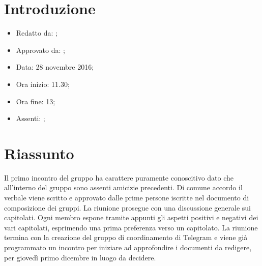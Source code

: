 \section{Introduzione}

	\begin{itemize}
		\item Redatto da: \NS;
		\item Approvato da: \AS;
		\item Data: 28 novembre 2016;
		\item Ora inizio: 11.30;
		\item Ora fine: 13;
		\item Assenti: \AN;		
	\end{itemize}

\section{Riassunto}
Il primo incontro del gruppo ha carattere puramente conoscitivo dato che all’interno del gruppo sono assenti amicizie precedenti. Di comune accordo il verbale viene scritto e approvato dalle prime persone iscritte nel documento di composizione dei gruppi. La riunione prosegue con una discussione generale sui capitolati. Ogni membro espone tramite appunti gli aspetti positivi e negativi dei vari capitolati, esprimendo una prima preferenza verso un capitolato. La riunione termina con la creazione del gruppo di coordinamento di Telegram e viene già programmato un incontro per iniziare ad approfondire i documenti da redigere, per giovedì primo dicembre in luogo da decidere.